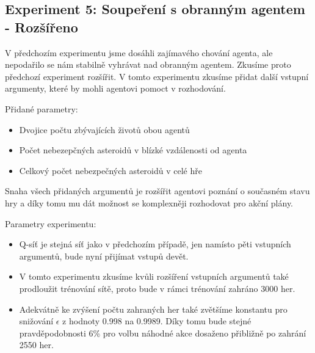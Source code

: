 \newpage
\subsection{Experiment 5: Soupeření s obranným agentem - Rozšířeno}
V předchozím experimentu jsme dosáhli zajímavého chování agenta, ale nepodařilo se nám stabilně vyhrávat nad obranným agentem.
Zkusíme proto předchozí experiment rozšířit. 
V tomto experimentu zkusíme přidat další vstupní argumenty, které by mohli agentovi pomoct v rozhodování.

Přidané parametry:
\begin{itemize}
    \item Dvojice počtu zbývajících životů obou agentů            
    \item Počet nebezepčných asteroidů v blízké vzdálenosti od agenta
    \item Celkový počet nebezpečných asteroidů v celé hře
\end{itemize}
Snaha všech přidaných argumentů je rozšířit agentovi poznání o současném stavu hry a díky tomu mu dát možnost se komplexněji rozhodovat pro akční plány.

Parametry experimentu:
\begin{itemize}
    \item Q-síť je stejná síť jako v předchozím případě, jen namísto pěti vstupních argumentů, bude nyní přijímat vstupů devět.
    \item V tomto experimentu zkusíme kvůli rozšíření vstupních argumentů také prodloužit trénování sítě, proto bude v rámci trénování zahráno 3000 her.
    \item Adekvátně ke zvýšení počtu zahraných her také zvětšíme konstantu pro snižování $\epsilon$ z hodnoty 0.998 na 0.9989. Díky tomu bude stejné pravděpodobnosti 6\% pro volbu náhodné akce dosaženo přibližně po zahrání 2550 her.
\end{itemize}

